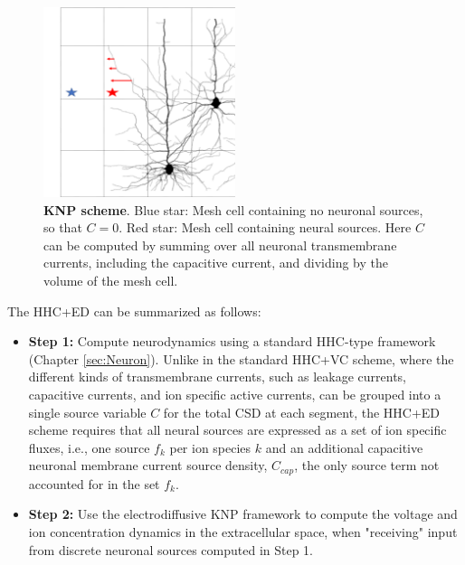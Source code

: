 \begin{figure}[!ht]
\begin{center}
\includegraphics[width=0.5\textwidth]{Figures/Eldiff/KNP.png}
\end{center}
\caption{\textbf{KNP scheme}. Blue star: Mesh cell containing no neuronal sources, so that $C=0$. Red star: Mesh cell containing neural sources. Here $C$ can be computed by summing over all neuronal transmembrane currents, including the capacitive current, and dividing by the volume of the mesh cell. }
\label{Eldiff:fig:KNPmesh}
\end{figure}

The HHC+ED can be summarized as follows:

\begin{itemize}
\item {\bf Step 1:} Compute neurodynamics using a standard HHC-type framework (Chapter \ref{sec:Neuron}). Unlike in the standard HHC+VC scheme, where the different kinds of transmembrane currents, such as leakage currents, capacitive currents, and ion specific active currents, can be grouped into a single source variable $C$ for the total CSD at each segment, the HHC+ED scheme requires that all neural sources are expressed as a set of ion specific fluxes, i.e., one source $f_k$ per ion species $k$ and an additional capacitive neuronal membrane current source density, $C_{cap}$, the only source term not accounted for in the set $f_k$.

\item {\bf Step 2:} Use the electrodiffusive KNP framework to compute the voltage and ion concentration dynamics in the extracellular space, when "receiving" input from discrete neuronal sources computed in Step 1.
\end{itemize}

